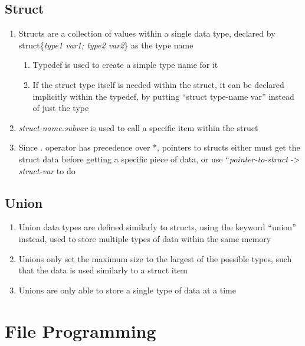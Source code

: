 \documentclass[11 pt, twoside]{article}
\begin{document}
\subsection{Struct}
\begin{enumerate}
\item Structs are a collection of values within a single data type, declared by struct\{\textit{type1 var1; type2 var2}\} as the type name
\begin{enumerate}
\item Typedef is used to create a simple type name for it
\item If the struct type itself is needed within the struct, it can be declared implicitly within the typedef, by putting ``struct type-name var'' instead of just the type
\end{enumerate}
\item \textit{struct-name.subvar} is used to call a specific item within the struct
\item Since . operator has precedence over *, pointers to structs either must get the struct data before getting a specific piece of data, or use ``\textit{pointer-to-struct} -> \textit{struct-var} to do 
\end{enumerate}

\subsection{Union}
\begin{enumerate}
\item Union data types are defined similarly to structs, using the keyword ``union'' instead, used to store multiple types of data within the same memory
\item Unions only set the maximum size to the largest of the possible types, such that the data is used similarly to a struct item
\item Unions are only able to store a single type of data at a time
\end{enumerate}

\section{File Programming}
\end{document}
